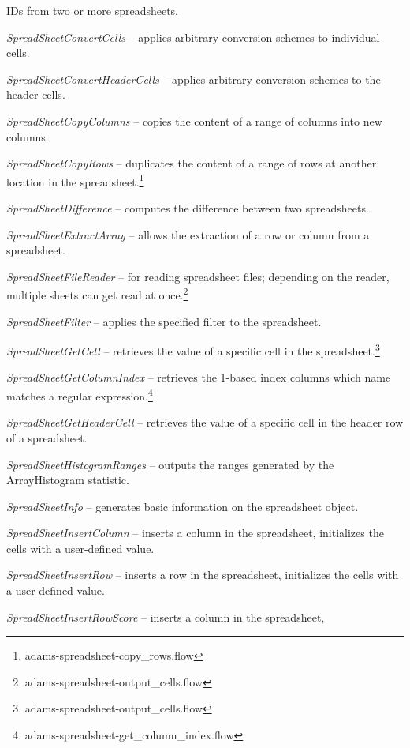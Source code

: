 \documentclass[a4paper]{book}
\begin{document}
\begin{tight_itemize}
	IDs from two or more spreadsheets.
	\item \textit{SpreadSheetConvertCells} -- applies arbitrary conversion
	schemes to individual cells.
	\item \textit{SpreadSheetConvertHeaderCells} -- applies arbitrary conversion 
	schemes to the header cells.
	\item \textit{SpreadSheetCopyColumns} -- copies the content of a range of
	columns into new columns.
	\item \textit{SpreadSheetCopyRows} -- duplicates the content of a range of
	rows at another location in the spreadsheet.\footnote{adams-spreadsheet-copy\_rows.flow}
	\item \textit{SpreadSheetDifference} -- computes the difference between two
	spreadsheets.
	\item \textit{SpreadSheetExtractArray} -- allows the extraction of a
	row or column from a spreadsheet.
	\item \textit{SpreadSheetFileReader} -- for reading spreadsheet
	files; depending on the reader, multiple sheets can get read at 
	once.\footnote{adams-spreadsheet-output\_cells.flow}
	\item \textit{SpreadSheetFilter} -- applies the specified filter to the
	spreadsheet.
	\item \textit{SpreadSheetGetCell} -- retrieves the value of a specific cell
	in the spreadsheet.\footnote{adams-spreadsheet-output\_cells.flow}
	\item \textit{SpreadSheetGetColumnIndex} -- retrieves the 1-based index columns
	which name matches a regular expression.\footnote{adams-spreadsheet-get\_column\_index.flow}
	\item \textit{SpreadSheetGetHeaderCell} -- retrieves the value of a specific cell
	in the header row of a spreadsheet.
	\item \textit{SpreadSheetHistogramRanges} -- outputs the ranges generated by the
	ArrayHistogram statistic.
	\item \textit{SpreadSheetInfo} -- generates basic information on the
	spreadsheet object.
	\item \textit{SpreadSheetInsertColumn} -- inserts a column in the spreadsheet,
	initializes the cells with a user-defined value.
	\item \textit{SpreadSheetInsertRow} -- inserts a row in the spreadsheet,
	initializes the cells with a user-defined value.
	\item \textit{SpreadSheetInsertRowScore} -- inserts a column in the spreadsheet,

\end{tight_itemize}
\end{document}
